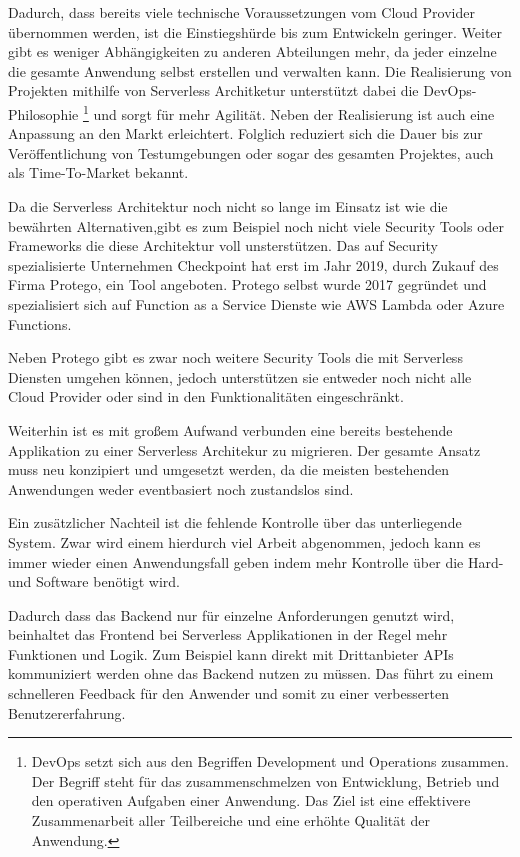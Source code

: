 Dadurch, dass bereits viele technische Voraussetzungen vom Cloud Provider übernommen werden, ist die Einstiegshürde bis zum Entwickeln geringer.
Weiter gibt es weniger Abhängigkeiten zu anderen Abteilungen mehr, da jeder einzelne die gesamte Anwendung selbst erstellen und verwalten kann.
Die Realisierung von Projekten mithilfe von Serverless Architketur unterstützt dabei die DevOps-Philosophie
\footnote{DevOps setzt sich aus den Begriffen Development und Operations zusammen. Der Begriff steht für
das zu­sam­men­schmel­zen von Entwicklung, Betrieb und den operativen Aufgaben einer Anwendung. Das Ziel ist eine effektivere
Zusammenarbeit aller Teilbereiche und eine erhöhte Qualität der Anwendung.} und sorgt für mehr Agilität.
Neben der Realisierung ist auch eine Anpassung an den Markt erleichtert.
Folglich reduziert sich die Dauer bis zur Veröffentlichung von Testumgebungen oder sogar des gesamten Projektes, auch
als Time-To-Market bekannt.\cite[]{DevOps}


Da die Serverless Architektur noch nicht so lange im Einsatz ist wie die bewährten Alternativen,gibt es zum Beispiel noch nicht
viele Security Tools oder Frameworks die diese Architektur voll unsterstützen. Das auf Security spezialisierte Unternehmen Checkpoint
hat erst im Jahr 2019, durch Zukauf des Firma Protego, ein Tool angeboten. Protego selbst wurde 2017 gegründet und spezialisiert
sich auf Function as a Service Dienste wie AWS Lambda oder Azure Functions. \cite[]{Checkpoint}

Neben Protego gibt es zwar noch weitere Security Tools die mit Serverless Diensten umgehen können, jedoch unterstützen sie
entweder noch nicht alle Cloud Provider oder sind in den Funktionalitäten eingeschränkt. \cite[]{Security}

Weiterhin ist es mit großem Aufwand verbunden eine bereits bestehende Applikation zu einer Serverless Architekur zu migrieren.
Der gesamte Ansatz muss neu konzipiert und umgesetzt werden, da die meisten bestehenden Anwendungen
weder eventbasiert noch zustandslos sind.

Ein zusätzlicher Nachteil ist die fehlende Kontrolle über das unterliegende System. Zwar wird einem hierdurch viel Arbeit abgenommen, jedoch kann es immer wieder
einen Anwendungsfall geben indem mehr Kontrolle über die Hard- und Software benötigt wird.

Dadurch dass das Backend nur für einzelne Anforderungen genutzt wird, beinhaltet das Frontend bei Serverless Applikationen
in der Regel mehr Funktionen und Logik. Zum Beispiel kann direkt mit Drittanbieter APIs kommuniziert werden ohne das Backend nutzen zu müssen.
Das führt zu einem schnelleren Feedback für den Anwender und somit zu einer verbesserten Benutzererfahrung.


